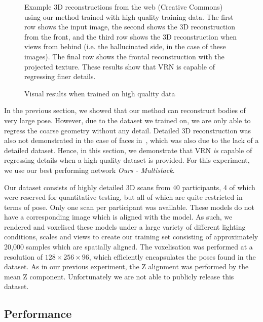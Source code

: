 \begin{figure}
\caption{Visual results when trained on high quality data}{Example 3D
  reconstructions from the web (Creative Commons) using our method
  trained with high quality training data. The first row shows the
  input image, the second shows the 3D reconstruction from the front,
  and the third row shows the 3D reconstruction when views from behind
  (i.e. the hallucinated side, in the case of these images). The final
  row shows the frontal reconstruction with the projected
  texture. These results show that VRN is capable of regressing finer
  details.}
  \label{fig:detailed}
\end{figure}

In the previous section, we showed that our method can reconstruct
bodies of very large pose. However, due to the dataset we trained on,
we are only able to regress the coarse geometry without any
detail. Detailed 3D reconstruction was also not demonstrated in the
case of faces in~\cite{jackson2017vrn}, which was also due to the lack
of a detailed dataset. Hence, in this section, we demonstrate that VRN
\textit{is} capable of regressing details when a high quality dataset
is provided. For this experiment, we use our best performing network
\textit{Ours - Multistack}.

Our dataset consists of highly detailed 3D scans from 40 participants,
4 of which were reserved for quantitative testing, but all of which
are quite restricted in terms of pose. Only one scan per participant
was available. These models do not have a corresponding image which is
aligned with the model. As such, we rendered and voxelised these
models under a large variety of different lighting conditions, scales
and views to create our training set consisting of approximately
20,000 samples which are spatially aligned.  The voxelisation was
performed at a resolution of $128\times 256\times 96$, which
efficiently encapsulates the poses found in the dataset. As in our
previous experiment, the Z alignment was performed by the mean Z
component. Unfortunately we are not able to publicly release this
dataset.

\subsection{Performance}

